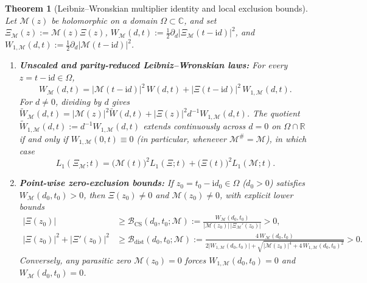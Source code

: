 \documentclass[11pt,reqno]{amsart}
\newtheorem{theorem}{Theorem}[section]
\theoremstyle{definition}
\theoremstyle{remark}
\numberwithin{equation}{section}
\newcommand{\ii}{\mathrm{i}}
\begin{document}
\begin{theorem}[Leibniz--Wronskian multiplier identity and local exclusion bounds]\label{thm:leibniz_wronskian}
Let $\mathcal{M}(z)$ be holomorphic on a domain $\Omega \subset \mathbb{C}$, and set $\Xi_{\mathcal{M}}(z) := \mathcal{M}(z)\Xi(z)$, $W_{\mathcal{M}}(d,t) := \frac{1}{2}\partial_d\lvert\Xi_{\mathcal{M}}(t-\ii d)\rvert^2$, and $W_{1,\mathcal{M}}(d,t) := \frac{1}{2}\partial_d\lvert\mathcal{M}(t-\ii d)\rvert^2$.
\begin{enumerate}[label=\textup{(\arabic*)},leftmargin=2.2em]
  \item \textbf{Unscaled and parity-reduced Leibniz--Wronskian laws:} For every $z = t - \ii d \in \Omega$,
  \begin{equation}\label{eq:W_M_unscaled}
    W_{\mathcal{M}}(d,t) = \lvert\mathcal{M}(t - \ii d)\rvert^2\,W(d,t) + \lvert\Xi(t - \ii d)\rvert^2\,W_{1,\mathcal{M}}(d,t).
  \end{equation}
  For $d \neq 0$, dividing by $d$ gives $\widetilde{W}_{\mathcal{M}}(d,t) = \lvert\mathcal{M}(z)\rvert^2\widetilde{W}(d,t) + \lvert\Xi(z)\rvert^2 d^{-1}W_{1,\mathcal{M}}(d,t)$. The quotient $\widetilde{W}_{1,\mathcal{M}}(d,t) := d^{-1}W_{1,\mathcal{M}}(d,t)$ extends continuously across $d = 0$ on $\Omega \cap \mathbb{R}$ if and only if $W_{1,\mathcal{M}}(0,t) \equiv 0$ (in particular, whenever $\mathcal{M}^\# = \mathcal{M}$), in which case
  \begin{equation}\label{eq:leibniz_wronskian_d0}
    L_1(\Xi_{\mathcal{M}}; t) = \bigl(\mathcal{M}(t)\bigr)^2 L_1(\Xi; t) + \bigl(\Xi(t)\bigr)^2 L_1(\mathcal{M}; t).
  \end{equation}
  \item \textbf{Point-wise zero-exclusion bounds:} If $z_0 = t_0 - \ii d_0 \in \Omega$ ($d_0 > 0$) satisfies $W_{\mathcal{M}}(d_0, t_0) > 0$, then $\Xi(z_0) \neq 0$ and $\mathcal{M}(z_0) \neq 0$, with explicit lower bounds
  \begin{align}
    \lvert\Xi(z_0)\rvert &\ge \mathcal{B}_{\mathrm{CS}}(d_0,t_0;\mathcal{M}) := \frac{W_{\mathcal{M}}(d_0,t_0)}{\lvert\mathcal{M}(z_0)\rvert\,\lvert\Xi_{\mathcal{M}}'(z_0)\rvert} > 0, \label{eq:B_CS_bound} \\
    \lvert\Xi(z_0)\rvert^2 + \lvert\Xi'(z_0)\rvert^2 &\ge \mathcal{B}_{\mathrm{dist}}(d_0,t_0;\mathcal{M}) := \frac{4\,W_{\mathcal{M}}(d_0,t_0)}{2\lvert W_{1,\mathcal{M}}(d_0,t_0)\rvert + \sqrt{\lvert\mathcal{M}(z_0)\rvert^4 + 4\,W_{1,\mathcal{M}}(d_0,t_0)^2}} > 0. \label{eq:B_dist_bound}
  \end{align}
  Conversely, any parasitic zero $\mathcal{M}(z_0) = 0$ forces $W_{1,\mathcal{M}}(d_0,t_0) = 0$ and $W_{\mathcal{M}}(d_0,t_0) = 0$.
\end{enumerate}
\end{theorem}
\end{document}
